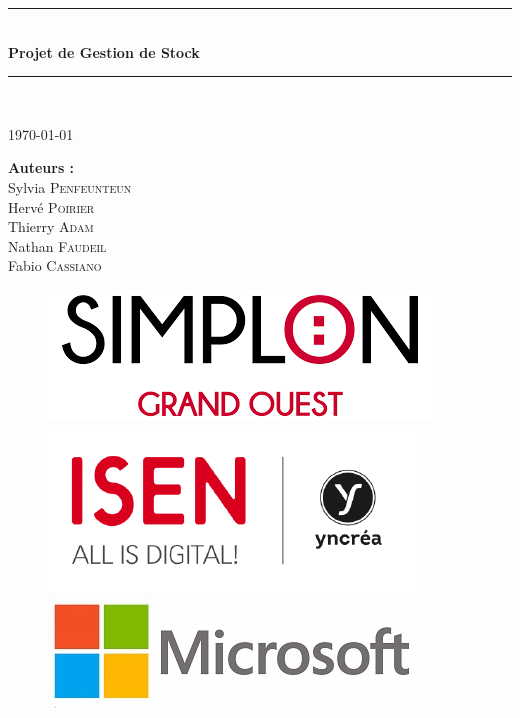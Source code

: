 \documentclass[french]{article}
\begin{document}
\begin{titlepage}

\newcommand{\HRule}{\rule{\linewidth}{0.5mm}} %

\center %
 
\HRule \\[0.4cm]
\vspace{1cm}
{ \huge \bfseries Projet de Gestion de Stock}\\ %
\vspace{1cm}
\HRule \\[1cm]
 
\vspace{1cm}

\Large \today

\vspace{3cm}

\begin{minipage}{0.4\textwidth}
\begin{center}
\Large \textbf{Auteurs :}\\
\vspace{0.5cm}
Sylvia \textsc{Penfeunteun} \\
Hervé \textsc{Poirier}\\
Thierry \textsc{Adam}\\
Nathan \textsc{Faudeil}\\
Fabio \textsc{Cassiano}
\end{center}
\end{minipage}

\vspace{5cm}

\begin{figure}[!ht]
	\includegraphics[height=0.1\columnwidth]{Image/logo/logo_simplon.png}
	\hspace*{0.5cm}
	\includegraphics[height=0.12\columnwidth]{Image/logo/logo_Isen.png}
	\hspace*{0.5cm}
	\includegraphics[height=0.1\columnwidth]{Image/logo/logo_microsoft.jpg}
\end{figure}


\end{titlepage}
\end{document}
